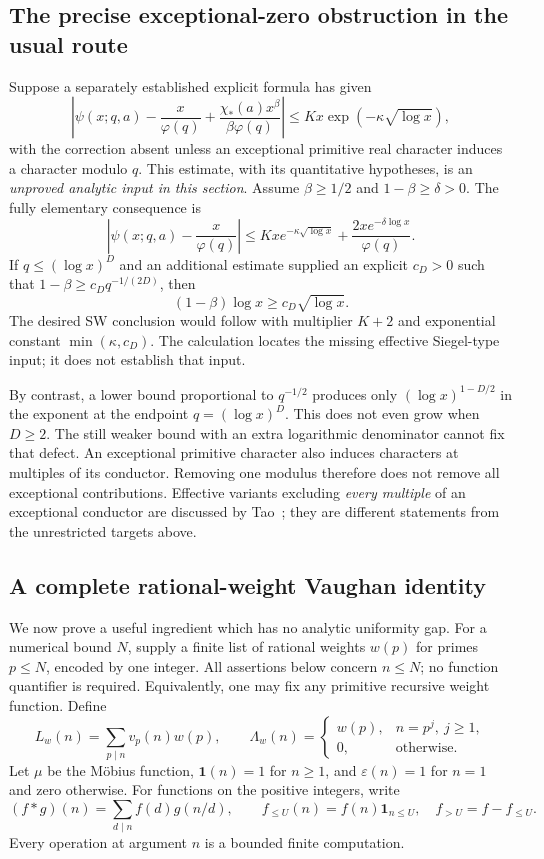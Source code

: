 \subsection{The precise exceptional-zero obstruction in the usual route}

Suppose a separately established explicit formula has given
\begin{equation}
 \left|\psi(x;q,a)-\frac{x}{\varphi(q)}
        +\frac{\chi_*(a)x^\beta}{\beta\varphi(q)}\right|
 \leq Kx\exp(-\kappa\sqrt{\log x}),
 \label{eq:conditional-exceptional-formula}
\end{equation}
with the correction absent unless an exceptional primitive real
character induces a character modulo $q$. This estimate, with its
quantitative hypotheses, is an \emph{unproved analytic input in this
section}. Assume $\beta\geq1/2$ and $1-\beta\geq\delta>0$.
The fully elementary consequence is
\[
 \left|\psi(x;q,a)-\frac{x}{\varphi(q)}\right|
 \leq Kx e^{-\kappa\sqrt{\log x}}
             +\frac{2x e^{-\delta\log x}}{\varphi(q)}.
\]
If $q\leq(\log x)^D$ and an additional estimate supplied an explicit
$c_D>0$ such that $1-\beta\geq c_Dq^{-1/(2D)}$, then
\[
 (1-\beta)\log x\geq c_D\sqrt{\log x}.
\]
The desired SW conclusion would follow with multiplier $K+2$ and
exponential constant $\min(\kappa,c_D)$. The calculation locates the
missing effective Siegel-type input; it does not establish that input.

By contrast, a lower bound proportional to $q^{-1/2}$ produces only
$(\log x)^{1-D/2}$ in the exponent at the endpoint
$q=(\log x)^D$. This does not even grow when $D\geq2$.
The still weaker bound with an extra logarithmic denominator cannot fix
that defect. An exceptional primitive character also induces characters
at multiples of its conductor. Removing one modulus therefore does not
remove all exceptional contributions. Effective variants excluding
\emph{every multiple} of an exceptional conductor are discussed by
Tao~\cite{TaoBV2015,TaoANT2014}; they are different statements from the
unrestricted targets above.

\subsection{A complete rational-weight Vaughan identity}

We now prove a useful ingredient which has no analytic uniformity gap.
For a numerical bound $N$, supply a finite list of rational weights
$w(p)$ for primes $p\leq N$, encoded by one integer. All assertions
below concern $n\leq N$; no function quantifier is required. Equivalently,
one may fix any primitive recursive weight function. Define
\[
 L_w(n)=\sum_{p\mid n}v_p(n)w(p),\qquad
 \Lambda_w(n)=
 \begin{cases}
 w(p),&n=p^j,\ j\geq1,\\
 0,&\text{otherwise}.
 \end{cases}
\]
Let $\mu$ be the M\"obius function, $\mathbf1(n)=1$ for $n\geq1$, and
$\varepsilon(n)=1$ for $n=1$ and zero otherwise. For functions on the
positive integers, write
\[
 (f*g)(n)=\sum_{d\mid n}f(d)g(n/d),\qquad
 f_{\leq U}(n)=f(n)\mathbf1_{n\leq U},\quad f_{>U}=f-f_{\leq U}.
\]
Every operation at argument $n$ is a bounded finite computation.

